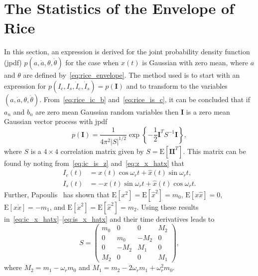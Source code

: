 \documentclass[12pt]{article}
\theoremstyle{plain}
\theoremstyle{definition}
\theoremstyle{remark}
\begin{document}
\section{The Statistics of the Envelope of Rice}
\label{sec:rice}
In this section, an expression is derived for the joint probability density function (jpdf) $p(a, \dot{a}, \theta, \dot{\theta})$ for the case when $x(t)$ is Gaussian with zero mean, where $a$ and $\theta$ are defined by~\eqref{eq:rice_envelope}. The method used is to start with an expression for $p(I_c, I_s, \dot{I}_c, \dot{I}_s) = p(\mathbf{I})$ and to transform to the variables $(a, \dot{a}, \theta, \dot{\theta})$. From~\eqref{eq:rice_ic_b} and~\eqref{eq:rice_is_c}, it can be concluded that if $a_n$ and $b_n$ are zero mean Gaussian random variables then $\mathbf{I}$ is a zero mean Gaussian vector process with jpdf
\begin{equation}
    p(\mathbf{I}) = \frac{1}{4\pi^2 |S|^{1/2}} \exp \left\{ -\frac{1}{2} \mathbf{I}^T S^{-1} \mathbf{I} \right\},
    \label{eq:jpdf_I}
\end{equation}
where $S$ is a $4 \times 4$ correlation matrix given by $S = \mathrm{E}[\mathbf{I} \mathbf{I}^T]$. This matrix can be found by noting from~\eqref{eq:ic_is_z} and~\eqref{eq:z_x_hatx} that
\begin{align}
    I_c(t) &= x(t) \cos \omega_r t + \hat{x}(t) \sin \omega_r t, \label{eq:ic_x_hatx} \\
    I_s(t) &= -x(t) \sin \omega_r t + \hat{x}(t) \cos \omega_r t. \label{eq:is_x_hatx}
\end{align}
Further, Papoulis~\cite{papoulis1984} has shown that $\mathrm{E}[x^2] = \mathrm{E}[\hat{x}^2] = m_0$, $\mathrm{E}[x \hat{x}] = 0$, $\mathrm{E}[x \dot{x}] = -m_1$, and $\mathrm{E}[\dot{x}^2] = \mathrm{E}[\hat{x}^2] = m_2$. Using these results in~\eqref{eq:ic_x_hatx}--\eqref{eq:is_x_hatx} and their time derivatives leads to
\begin{equation}
    S = \begin{pmatrix}
        m_0 & 0 & 0 & M_2 \\
        0 & m_0 & -M_2 & 0 \\
        0 & -M_2 & M_1 & 0 \\
        M_2 & 0 & 0 & M_1
    \end{pmatrix},
    \label{eq:rice_S_matrix}
\end{equation}
where $M_2 = m_1 - \omega_r m_0$ and $M_1 = m_2 - 2\omega_r m_1 + \omega_r^2 m_0$.
\end{document}

